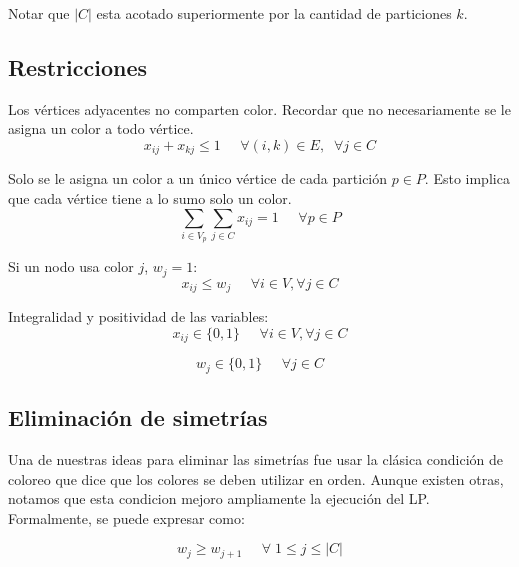 Notar que $|C|$ esta acotado superiormente por la cantidad de particiones $k$.

\vspace{10px}

\subsection{Restricciones}
\label{restricciones}

Los vértices adyacentes no comparten color. Recordar que no necesariamente se le asigna un color a todo vértice.
\begin{equation}
x_{ij} + x_{kj} \leq 1 \;\;\;\;\; \forall (i,k) \in E,\;\; \forall j \in C
\end{equation}

Solo se le asigna un color a un único vértice de cada partición $p \in P$. Esto implica que cada vértice tiene a lo sumo solo un color.
\begin{equation}
\sum_{i \in V_p} \sum_{j \in C} x_{ij} = 1 \;\;\;\;\; \forall p \in P
\end{equation}

Si un nodo usa color $j$, $w_j = 1$:
\begin{equation}
x_{ij} \leq w_j \;\;\;\;\; \forall i \in V, \forall j \in C
\end{equation}

Integralidad y positividad de las variables:
\begin{equation}
x_{ij} \in \{0,1\} \;\;\;\;\; \forall i \in V, \forall j \in C
\end{equation}

\begin{equation}
w_j \in \{0,1\} \;\;\;\;\; \forall j \in C
\end{equation}

\subsection{Eliminación de simetrías}
\label{simetria}

Una de nuestras ideas para eliminar las simetrías fue usar la clásica condición de coloreo que dice que los colores se deben utilizar en orden. Aunque existen otras, notamos que esta condicion mejoro ampliamente la ejecución del LP. Formalmente, se puede expresar como:

\begin{equation}
w_j \geq w_{j+1} \;\;\;\;\; \forall \; 1 \leq j \leq |C|
\end{equation}